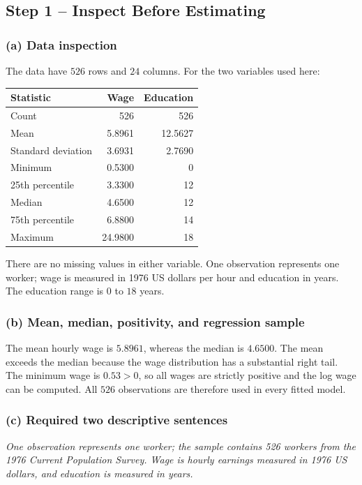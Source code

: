 \documentclass[11pt,a4paper]{article}
\begin{document}
\subsection{Step 1 -- Inspect Before Estimating}
\subsubsection*{(a) Data inspection}
The data have $526$ rows and $24$ columns. For the two variables used here:
\begin{center}
\begin{tabular}{lrr}
\toprule
Statistic & Wage & Education\\
\midrule
Count & 526 & 526\\
Mean & 5.8961 & 12.5627\\
Standard deviation & 3.6931 & 2.7690\\
Minimum & 0.5300 & 0\\
25th percentile & 3.3300 & 12\\
Median & 4.6500 & 12\\
75th percentile & 6.8800 & 14\\
Maximum & 24.9800 & 18\\
\bottomrule
\end{tabular}
\end{center}
There are no missing values in either variable. One observation represents one worker; wage is measured in 1976 US dollars per hour and education in years. The education range is $0$ to $18$ years.

\subsubsection*{(b) Mean, median, positivity, and regression sample}
The mean hourly wage is $5.8961$, whereas the median is $4.6500$. The mean exceeds the median because the wage distribution has a substantial right tail. The minimum wage is $0.53>0$, so all wages are strictly positive and the log wage can be computed. All $526$ observations are therefore used in every fitted model.

\subsubsection*{(c) Required two descriptive sentences}
\emph{One observation represents one worker; the sample contains 526 workers from the 1976 Current Population Survey. Wage is hourly earnings measured in 1976 US dollars, and education is measured in years.}
\end{document}
